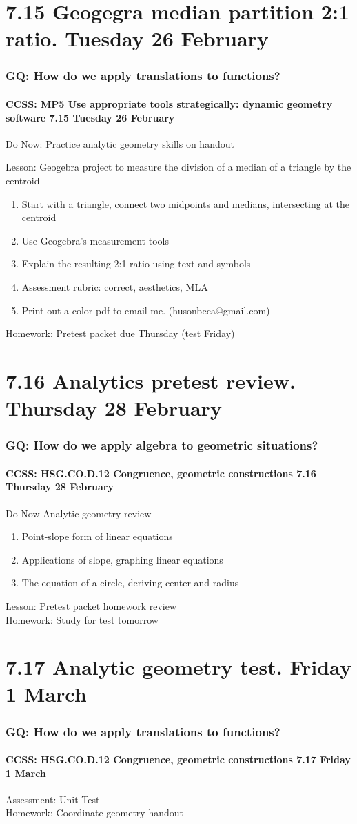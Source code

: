 \documentclass{beamer}
\begin{document}
\section{7.15 Geogegra median partition 2:1 ratio. Tuesday 26 February}
  \frame
  {
    \frametitle{GQ: How do we apply translations to functions?}
    \framesubtitle{CCSS: MP5 Use appropriate tools strategically: dynamic geometry software \hfill \alert{7.15 Tuesday 26 February}}

    Do Now: Practice analytic geometry skills on handout
    \begin{block}{Lesson: Geogebra project to measure the division of a median of a triangle by the centroid}
      \begin{enumerate}
        \item Start with a triangle, connect two midpoints and medians, intersecting at the centroid
        \item Use Geogebra's measurement tools
        \item Explain the resulting 2:1 ratio using text and symbols
        \item Assessment rubric: correct, aesthetics, MLA
        \item Print out a color pdf to email me. (husonbeca@gmail.com)
      \end{enumerate}
    \end{block}
    Homework: Pretest packet due Thursday \alert{(test Friday)}
  }

\section{7.16 Analytics pretest review. Thursday 28 February}
  \frame
  {
    \frametitle{GQ: How do we apply algebra to geometric situations?}
    \framesubtitle{CCSS: HSG.CO.D.12 Congruence, geometric constructions \hfill \alert{7.16 Thursday 28 February}}

    \begin{block}{Do Now Analytic geometry review}
      \begin{enumerate}
        \item Point-slope form of linear equations
        \item Applications of slope, graphing linear equations
        \item The equation of a circle, deriving center and radius
      \end{enumerate}
    \end{block}
    Lesson: Pretest packet homework review\\[0.5cm]
    Homework: Study for \alert{test tomorrow}
  }

\section{7.17 Analytic geometry test. Friday 1 March}
  \frame
  {
    \frametitle{GQ: How do we apply translations to functions?}
    \framesubtitle{CCSS: HSG.CO.D.12 Congruence, geometric constructions \hfill \alert{7.17 Friday 1 March}}

    Assessment: Unit Test\\[0.5cm]
    Homework: Coordinate geometry handout
  }
\end{document}
